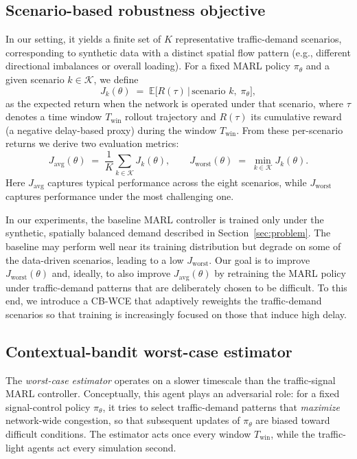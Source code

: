 \documentclass{ifacconf}
\newcommand{\1}{\mbox{1}\hspace{-0.25em}\mbox{l}}
\begin{document}
\subsection{Scenario-based robustness objective}
\label{subsec:robust-objective}

In our setting, it yields a finite set of $K$ representative traffic-demand scenarios,
corresponding to synthetic data with a distinct spatial flow pattern (e.g., different directional imbalances or overall loading). For a fixed MARL policy $\pi_\theta$ and a given scenario $k \in \mathcal{K}$, we define
\[
J_k(\theta)
\;=\;
\mathbb{E}\big[ R(\tau) \,\big|\, \text{scenario } k,\; \pi_\theta \big],
\]
as the expected return when the network is operated under that scenario, where $\tau$ denotes a time window $T_{\mathrm{win}}$ rollout trajectory and $R(\tau)$ its cumulative reward (a negative delay-based proxy) during the window $T_{\mathrm{win}}$. From these per-scenario returns we derive two evaluation metrics:
\begin{equation}
J_{\mathrm{avg}}(\theta)
\;=\;
\frac{1}{K} \sum_{k \in \mathcal{K}} J_k(\theta),
\qquad
J_{\mathrm{worst}}(\theta)
\;=\;
\min_{k \in \mathcal{K}} J_k(\theta).
\label{eq:j-avg-worst}
\end{equation}
Here $J_{\mathrm{avg}}$ captures typical performance across the eight scenarios, while $J_{\mathrm{worst}}$ captures performance under the most challenging one.

In our experiments, the baseline MARL controller is trained only under the synthetic, spatially balanced demand described in Section~\ref{sec:problem}. The baseline may perform well near its training distribution but degrade on some of the data-driven scenarios, leading to a low $J_{\mathrm{worst}}$. Our goal is to improve $J_{\mathrm{worst}}(\theta)$ and, ideally, to also improve $J_{\mathrm{avg}}(\theta)$ by retraining the MARL policy under traffic-demand patterns that are deliberately chosen to be difficult.
To this end, we introduce a CB-WCE that adaptively reweights the traffic-demand scenarios so that training is increasingly focused on those that induce high delay. 



\subsection{Contextual-bandit worst-case estimator}
\label{subsec:cb-estimator} The \emph{worst-case estimator} operates on a slower timescale than the traffic-signal MARL controller. Conceptually, this agent plays an adversarial role: for a fixed signal-control policy $\pi_\theta$, it tries to select traffic-demand patterns that \emph{maximize} network-wide congestion, so that subsequent updates of $\pi_\theta$ are biased toward difficult conditions. The estimator acts once every window $T_{\mathrm{win}}$, while the traffic-light agents act every simulation second.
\end{document}
